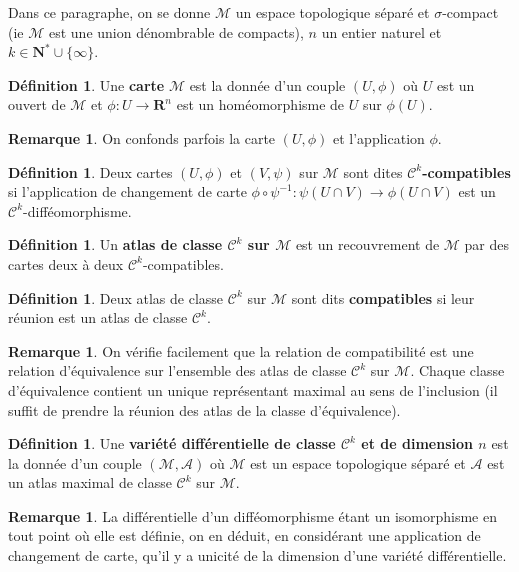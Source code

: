 \documentclass[12pt,a4paper]{article}
\theoremstyle{definition}
\newtheorem{defn}[thm]{Définition}
\newtheorem{rqe}[thm]{Remarque}
\begin{document}
Dans ce paragraphe, on se donne $\mathcal{M}$ un espace topologique séparé et $\sigma$-compact (ie $\mathcal{M}$ est une union dénombrable de compacts), $n$ un entier naturel et $k\in\mathbf{N}^*\cup\{\infty\}$.
\begin{defn}
Une \textbf{carte} $\mathcal{M}$ est la donnée d'un couple $(U,\phi)$ où $U$ est un ouvert de $\mathcal{M}$ et $\phi:U\to\mathbf{R}^n$ est un homéomorphisme de $U$ sur $\phi(U)$.
\end{defn}
\begin{rqe}
On confonds parfois la carte $(U,\phi)$ et l'application $\phi$.
\end{rqe}
\begin{defn}
Deux cartes $(U,\phi)$ et $(V,\psi)$ sur $\mathcal{M}$ sont dites \textbf{$\mathcal{C}^k$-compatibles} si l'application de changement de carte $\phi\circ\psi^{-1}:\psi(U\cap V)\to \phi(U\cap V)$ est un $\mathcal{C}^k$-difféomorphisme.
\end{defn}
\begin{defn}
Un \textbf{atlas de classe $\mathcal{C}^k$ sur $\mathcal{M}$} est un recouvrement de $\mathcal{M}$ par des cartes deux à deux $\mathcal{C}^k$-compatibles.
\end{defn}
\begin{defn}
Deux atlas de classe $\mathcal{C}^k$ sur $\mathcal{M}$ sont dits \textbf{compatibles} si leur réunion est un atlas de classe $\mathcal{C}^k$.
\end{defn}
\begin{rqe}
On vérifie facilement que la relation de compatibilité est une relation d'équivalence sur l'ensemble des atlas de classe $\mathcal{C}^k$ sur $\mathcal{M}$. Chaque classe d'équivalence contient un unique représentant maximal au sens de l'inclusion (il suffit de prendre la réunion des atlas de la classe d'équivalence).
\end{rqe}
\begin{defn}
Une \textbf{variété différentielle de classe $\mathcal{C}^k$ et de dimension $n$} est la donnée d'un couple $(\mathcal{M},\mathcal{A})$ où $\mathcal{M}$ est un espace topologique séparé et $\mathcal{A}$ est un atlas maximal de classe $\mathcal{C}^k$ sur $\mathcal{M}$.
\end{defn}
\begin{rqe}
La différentielle d'un difféomorphisme étant un isomorphisme en tout point où elle est définie, on en déduit, en considérant une application de changement de carte, qu'il y a unicité de la dimension d'une variété différentielle.
\end{rqe}
\end{document}
